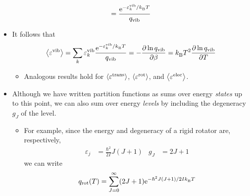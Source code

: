 \documentclass[../notes.tex]{subfiles}
\begin{document}
\begin{itemize}
\begin{equation*}
        = \frac{\e[-\varepsilon_k^\text{vib}/\kB T]}{q_\text{vib}}
    \end{equation*}
    \item It follows that
    \begin{equation*}
        \prb{\varepsilon^\text{vib}} = \sum_k\varepsilon_k^\text{vib}\frac{\e[-\varepsilon_k^\text{vib}/\kB T]}{q_\text{vib}}
        = -\pdv{\ln q_\text{vib}}{\beta}
        = \kB T^2\pdv{\ln q_\text{vib}}{T}
    \end{equation*}
    \begin{itemize}
        \item Analogous results hold for $\prb{\varepsilon^\text{trans}}$, $\prb{\varepsilon^\text{rot}}$, and $\prb{\varepsilon^\text{elec}}$.
    \end{itemize}
    \item Although we have written partition functions as sums over energy \emph{states} up to this point, we can also sum over energy \emph{levels} by including the degeneracy $g_J$ of the level.
    \begin{itemize}
        \item For example, since the energy and degeneracy of a rigid rotator are, respectively,
        \begin{align*}
            \varepsilon_j &= \frac{\hbar^2}{2I}J(J+1)&
            g_J &= 2J+1
        \end{align*}
        we can write
        \begin{equation*}
            q_\text{rot}(T) = \sum_{J=0}^\infty(2J+1)\e[-\hbar^2J(J+1)/2I\kB T]
        \end{equation*}
    \end{itemize}
\end{itemize}
\end{document}
